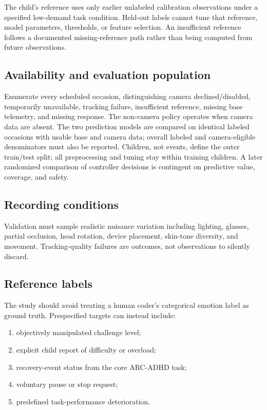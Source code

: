 The child's reference uses only earlier unlabeled calibration observations under a specified low-demand task condition. Held-out labels cannot tune that reference, model parameters, thresholds, or feature selection. An insufficient reference follows a documented missing-reference path rather than being computed from future observations.

\subsection{Availability and evaluation population}

Enumerate every scheduled occasion, distinguishing camera declined/disabled, temporarily unavailable, tracking failure, insufficient reference, missing base telemetry, and missing response. The non-camera policy operates when camera data are absent. The two prediction models are compared on identical labeled occasions with usable base and camera data; overall labeled and camera-eligible denominators must also be reported. Children, not events, define the outer train/test split; all preprocessing and tuning stay within training children. A later randomized comparison of controller decisions is contingent on predictive value, coverage, and safety.

\subsection{Recording conditions}

Validation must sample realistic nuisance variation including lighting, glasses, partial occlusion, head rotation, device placement, skin-tone diversity, and movement. Tracking-quality failures are outcomes, not observations to silently discard.

\subsection{Reference labels}

The study should avoid treating a human coder's categorical emotion label as ground truth. Prespecified targets can instead include:

\begin{enumerate}
\item objectively manipulated challenge level;
\item explicit child report of difficulty or overload;
\item recovery-event status from the core ARC-ADHD task;
\item voluntary pause or stop request;
\item predefined task-performance deterioration.
\end{enumerate}

